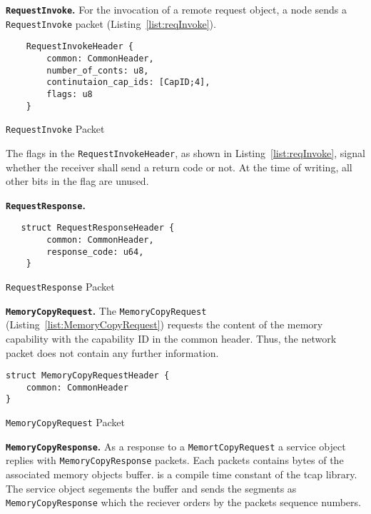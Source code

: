 \textbf{\texttt{RequestInvoke}.}
For the invocation of a remote request object, a node sends a \texttt{RequestInvoke} packet (Listing~\ref{list:reqInvoke}).

\begin{listing}[H]
  \begin{verbatim}
    RequestInvokeHeader {
        common: CommonHeader,
        number_of_conts: u8,
        continutaion_cap_ids: [CapID;4],
        flags: u8
    }
  \end{verbatim}
  \caption{\label{list:reqInvoke} \texttt{RequestInvoke} Packet}
\end{listing}

The flags in the \texttt{RequestInvokeHeader}, as shown in Listing~\ref{list:reqInvoke}, signal whether the receiver shall send a return code or not. At the time of writing, all other bits in the flag are unused.


\textbf{\texttt{RequestResponse}.}
\begin{listing}[H]
  \begin{verbatim}
   struct RequestResponseHeader {
        common: CommonHeader,
        response_code: u64,
    }
  \end{verbatim}
  \caption{\label{list:reqresp} \texttt{RequestResponse} Packet}
\end{listing}

\textbf{\texttt{MemoryCopyRequest}.}
The \texttt{MemoryCopyRequest} (Listing~\ref{list:MemoryCopyRequest}) requests the content of the memory capability with the capability ID in the common header. Thus, the network packet does not contain any further information.

\begin{listing}[H]
  \begin{verbatim}
struct MemoryCopyRequestHeader {
    common: CommonHeader
}
  \end{verbatim}
  \caption{\label{list:MemoryCopyRequest} \texttt{MemoryCopyRequest} Packet}
\end{listing}


\textbf{\texttt{MemoryCopyResponse}.}
As a response to a \texttt{MemortCopyRequest} a service object replies with \texttt{MemoryCopyResponse} packets. Each packets contains  bytes of the associated memory objects buffer.  is a compile time constant of the tcap library. The service object segements the buffer and sends the segments as \texttt{MemoryCopyResponse} which the reciever orders by the packets sequence numbers.

